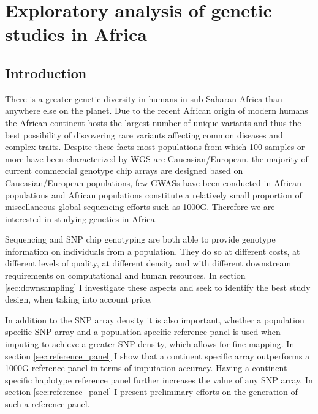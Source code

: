 \chapter{Exploratory analysis of genetic studies in Africa}

\section{Introduction}

There is a greater genetic diversity in humans in sub Saharan Africa than anywhere else on the planet.\cite{Bowcock1994}\cite{Jorde1995}\cite{Tishkoff08031996}\cite{Jorde2000}\cite{Stephens2001}\cite{Tishkoff2002}\cite{Stringer2003}\cite{Tishkoff2004}\cite{HapMap2005}\cite{Ramachandran01112005}\cite{Tishkoff22052009}\cite{1000G2010}\cite{1000G2012}\cite{Gurdasani2015}
Due to the recent African origin of modern humans the African continent hosts the largest number of unique variants and thus the best possibility of discovering rare variants affecting common diseases and complex traits.
Despite these facts most populations from which 100 samples or more have been characterized by \gls{WGS} are Caucasian/European, the majority of current commercial genotype chip arrays are designed based on Caucasian/European populations, few \glspl{GWAS} have been conducted in African populations and African populations constitute a relatively small proportion of miscellaneous global sequencing efforts such as 1000G.\cite{1000G2012}
Therefore we are interested in studying genetics in Africa.

Sequencing and \gls{SNP} chip genotyping are both able to provide genotype information on individuals from a population. They do so at different costs, at different levels of quality, at different density and with different downstream requirements on computational and human resources. In section \ref{sec:downsampling} I investigate these aspects and seek to identify the best study design, when taking into account price.

In addition to the \gls{SNP} array density it is also important, whether a population specific \gls{SNP} array and a population specific reference panel is used when imputing to achieve a greater SNP density, which allows for fine mapping. In section \ref{sec:reference_panel} I show that a continent specific array outperforms a 1000G reference panel in terms of imputation accuracy. Having a continent specific haplotype reference panel further increases the value of any SNP array. In section \ref{sec:reference_panel} I present preliminary efforts on the generation of such a reference panel.


